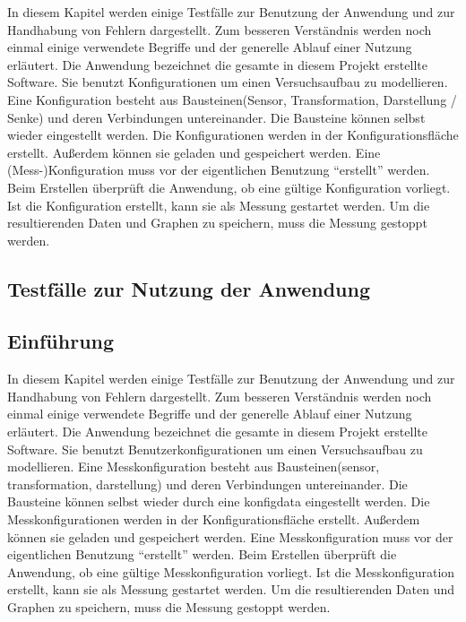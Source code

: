 \documentclass[parskip=full]{scrartcl}
\begin{document}
In diesem Kapitel werden einige Testfälle zur Benutzung der Anwendung und zur Handhabung von Fehlern dargestellt. Zum besseren Verständnis werden noch einmal einige verwendete Begriffe und der generelle Ablauf einer Nutzung erläutert. Die Anwendung bezeichnet die gesamte in diesem Projekt erstellte Software. Sie benutzt Konfigurationen um einen Versuchsaufbau zu modellieren. Eine Konfiguration besteht aus Bausteinen(Sensor, Transformation, Darstellung / Senke) und deren Verbindungen untereinander. Die Bausteine können selbst wieder eingestellt werden. Die Konfigurationen werden in der Konfigurationsfläche erstellt. Außerdem können sie geladen und gespeichert werden. Eine (Mess-)Konfiguration muss vor der eigentlichen Benutzung "`erstellt"' werden. Beim Erstellen überprüft die Anwendung, ob eine gültige Konfiguration vorliegt. Ist die Konfiguration erstellt, kann sie als Messung gestartet werden. Um die resultierenden Daten und Graphen zu speichern, muss die Messung gestoppt werden.

\subsection{Testfälle zur Nutzung der Anwendung}

\subsection{Einführung}

In diesem Kapitel werden einige Testfälle zur Benutzung der Anwendung und zur Handhabung von Fehlern dargestellt. Zum besseren Verständnis werden noch einmal einige verwendete Begriffe und der generelle Ablauf einer Nutzung erläutert. Die Anwendung bezeichnet die gesamte in diesem Projekt erstellte Software. Sie benutzt \gls{Benutzerkonfiguration}en um einen Versuchsaufbau zu modellieren. Eine Messkonfiguration besteht aus Bausteinen(\gls{sensor}, \gls{transformation}, \gls{darstellung}) und deren Verbindungen untereinander. Die Bausteine können selbst wieder  durch eine \gls{konfigdata} eingestellt werden. Die Messkonfigurationen werden in der Konfigurationsfläche erstellt. Außerdem können sie geladen und gespeichert werden. Eine Messkonfiguration muss vor der eigentlichen Benutzung "`erstellt"' werden. Beim Erstellen überprüft die Anwendung, ob eine gültige Messkonfiguration vorliegt. Ist die Messkonfiguration erstellt, kann sie als Messung gestartet werden. Um die resultierenden Daten und Graphen zu speichern, muss die Messung gestoppt werden.
\end{document}

